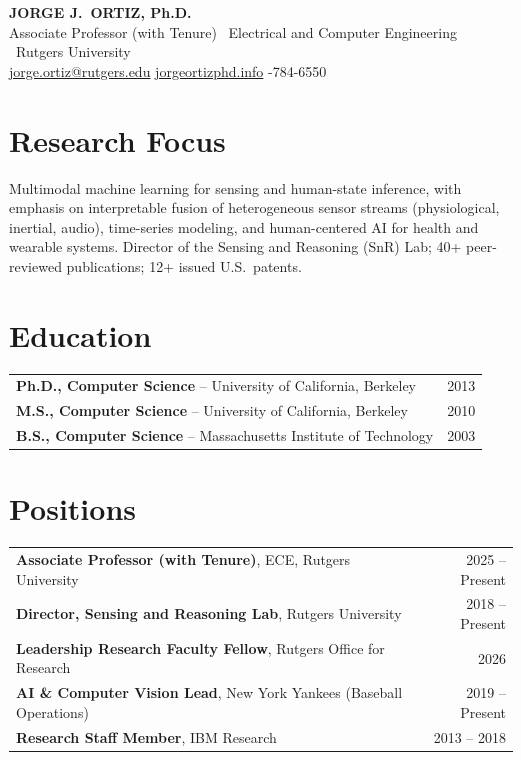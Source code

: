 \documentclass[11pt,letterpaper]{article}
\begin{document}
\begin{center}
{\large\bfseries JORGE J.\ ORTIZ, Ph.D.}\\[1pt]
{\small Associate Professor (with Tenure) \textbullet\ Electrical and Computer Engineering \textbullet\ Rutgers University}\\[1pt]
{\small \href{mailto:jorge.ortiz@rutgers.edu}{jorge.ortiz@rutgers.edu}
\quad\textbar\quad \href{http://jorgeortizphd.info}{jorgeortizphd.info}
\quad\textbar{}-784-6550}
\end{center}

\vspace{1pt}

\section{Research Focus}

{\small Multimodal machine learning for sensing and human-state inference, with emphasis on interpretable fusion of heterogeneous sensor streams (physiological, inertial, audio), time-series modeling, and human-centered AI for health and wearable systems.
Director of the Sensing and Reasoning (SnR) Lab; 40+ peer-reviewed publications; 12+ issued U.S.\ patents.}

\section{Education}

{\small\begin{tabularx}{\textwidth}{@{}X r@{}}
\textbf{Ph.D., Computer Science} -- University of California, Berkeley & 2013 \\
\textbf{M.S., Computer Science} -- University of California, Berkeley & 2010 \\
\textbf{B.S., Computer Science} -- Massachusetts Institute of Technology & 2003 \\
\end{tabularx}}

\section{Positions}

{\small\begin{tabularx}{\textwidth}{@{}X r@{}}
\textbf{Associate Professor (with Tenure)}, ECE, Rutgers University & 2025 -- Present \\
\textbf{Director, Sensing and Reasoning Lab}, Rutgers University & 2018 -- Present \\
\textbf{Leadership Research Faculty Fellow}, Rutgers Office for Research & 2026 \\
\textbf{AI \& Computer Vision Lead}, New York Yankees (Baseball Operations) & 2019 -- Present \\
\textbf{Research Staff Member}, IBM Research & 2013 -- 2018 \\
\end{tabularx}}
\end{document}
